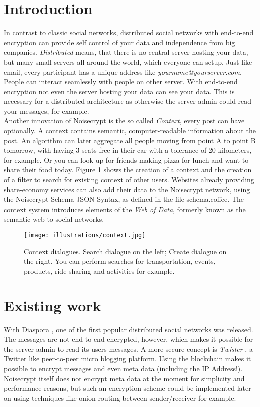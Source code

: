 \documentclass{scrartcl}
\begin{document}
\newpage
\section{Introduction}
In contrast to classic social networks, distributed social networks with end-to-end encryption can provide self control of your data and  independence from big companies.  \textit{Distributed} means, that there is no central server hosting your data, but many small servers all around the world, which everyone can  setup. Just like email, every participant has a unique address like \textit{yourname@yourserver.com}. People can interact seamlessly with people on other server. With end-to-end encryption not even the server hosting your data can see your data. This is necessary for a distributed architecture as otherwise the server admin could read your messages, for example.\\

Another innovation of Noisecrypt is the so called \textit{Context}, every post can have optionally. A context contains semantic, computer-readable information about the post.
 An algorithm can later aggregate all people moving from point A to point B tomorrow, with having 3 seats free in their car with a tolerance of 20 kilometers, for example. Or you can look up for friends making pizza for lunch and want to share their food today. Figure \ref{figContext} shows the creation of a context and the creation of a filter to search for existing context of other users. 
 Websites already providing share-economy services can also add their data to the Noisecrypt network, using the Noisecrypt Schema JSON Syntax, as defined in the file schema.coffee. The context system introduces elements of the \textit{Web of Data}, formerly known as the semantic web to social networks.

\begin{figure}[ht]
	\centering
  \texttt{[image: illustrations/context.jpg]}
	\caption{Context dialogues. Search dialogue on the left; Create dialogue on the right. You can perform searches for transportation, events, products, ride sharing and activities for example.}
	\label{figContext}
\end{figure}
\newpage
 \section{Existing work}
With Diaspora \cite{diaspora}, one of the first popular distributed social networks was released. The messages are not end-to-end encrypted, however, which makes it possible for the server admin to read its users messages. 
A more secure concept is \textit{Twister} \cite{twister}, a Twitter like peer-to-peer micro blogging platform. Using the blockchain makes it possible to encrypt messages and even meta data (including the IP Address!). Noisecrypt itself does not encrypt meta data at the moment for simplicity and performance reasons, but such an encryption scheme could be implemented later on using techniques like onion routing between sender/receiver for example.
\end{document}
